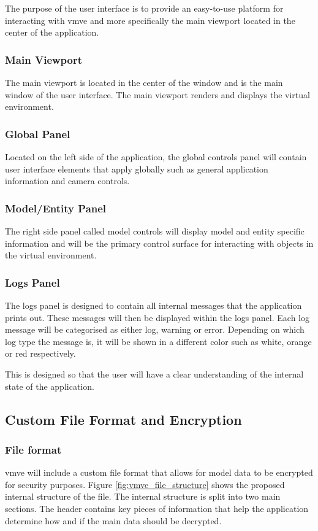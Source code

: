 \documentclass[11pt]{article}
\begin{document}
The purpose of the user interface is to provide an easy-to-use platform for
interacting with \gls*{vmve} and more specifically the main viewport located in
the center of the application.

\subsubsection{Main Viewport}
The main viewport is located in the center of the window and is the main window
of the user interface. The main viewport renders and displays the virtual
environment.

\subsubsection{Global Panel}
Located on the left side of the application, the global controls panel will
contain user interface elements that apply globally such as general application
information and camera controls.

\subsubsection{Model/Entity Panel}
The right side panel called model controls will display model and entity
specific information and will be the primary control surface for interacting
with objects in the virtual environment.


\subsubsection{Logs Panel}
The logs panel is designed to contain all internal messages that the application
prints out. These messages will then be displayed within the logs panel. Each
log message will be categorised as either log, warning or error. Depending on
which log type the message is, it will be shown in a different color such as
white, orange or red respectively.

This is designed so that the user will have a clear understanding of the internal state
of the application.

\subsection{Custom File Format and Encryption}

\subsubsection{File format}
\gls*{vmve} will include a custom file format that allows for model data to be
encrypted for security purposes. Figure \ref{fig:vmve_file_structure} shows the
proposed internal structure of the file. The internal structure is split into
two main sections. The header contains key pieces of information that help the
application determine how and if the main data should be decrypted.
\end{document}
